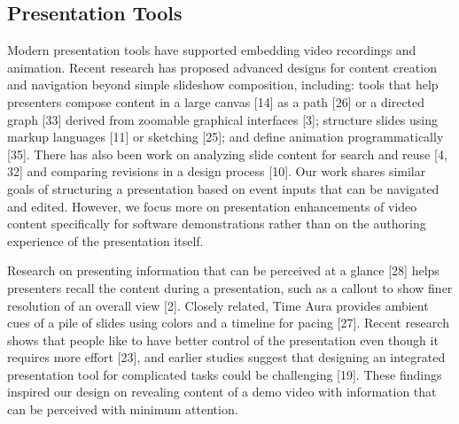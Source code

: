 \subsection{Presentation Tools}
Modern presentation tools have supported embedding video recordings and animation. Recent research has proposed advanced designs for content creation and navigation beyond simple slideshow composition, including: tools that help presenters compose content in a large canvas [14] as a path [26] or a directed graph [33] derived from zoomable graphical interfaces [3]; structure slides using markup languages [11] or sketching [25]; and define animation programmatically [35]. There has also been work on analyzing slide content for search and reuse [4, 32] and comparing revisions in a design process [10]. Our work shares similar goals of structuring a presentation based on event inputs that can be navigated and edited. However, we focus more on presentation enhancements of video content specifically for software demonstrations rather than on the authoring experience of the presentation itself.

Research on presenting information that can be perceived at a glance [28] helps presenters recall the content during a presentation, such as a callout to show finer resolution of an overall view [2]. Closely related, Time Aura provides ambient cues of a pile of slides using colors and a timeline for pacing [27]. Recent research shows that people like to have better control of the presentation even though it requires more effort [23], and earlier studies suggest that designing an integrated presentation tool for complicated tasks could be challenging [19]. These findings inspired our design on revealing content of a demo video with information that can be perceived with minimum attention.
